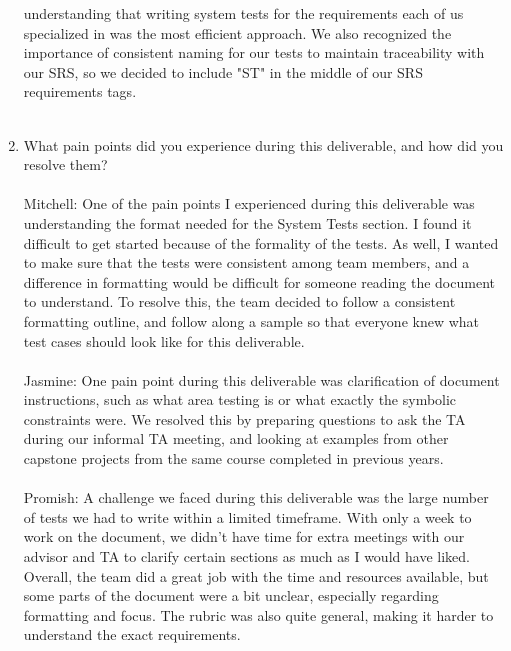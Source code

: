\documentclass[12pt, titlepage]{article}
\begin{document}
\begin{enumerate}
  understanding that writing system tests for the requirements each of us specialized in 
  was the most efficient approach. We also recognized the importance of consistent naming 
  for our tests to maintain traceability with our SRS, so we decided to include "ST" in 
  the middle of our SRS requirements tags.\\\\
  \item What pain points did you experience during this deliverable, and how
    did you resolve them?\\\\
  \newline
  \hspace{2em} Mitchell: One of the pain points I experienced during this deliverable was understanding the
  format needed for the System Tests section. I found it difficult to get started because of the formality
  of the tests. As well, I wanted to make sure that the tests were consistent among team members, and a difference
  in formatting would be difficult for someone reading the document to understand. To resolve this, the team decided
  to follow a consistent formatting outline, and follow along a sample so that everyone knew what test cases
  should look like for this deliverable.\\\\
  \hspace{2em} Jasmine: One pain point during this deliverable was clarification of document instructions, 
  such as what area testing is or what exactly the symbolic constraints were. We resolved this by preparing 
  questions to ask the TA during our informal TA meeting, and looking at examples from other capstone projects 
  from the same course completed in previous years.\\\\
  \hspace{2em} Promish: A challenge we faced during this deliverable was the 
  large number of tests we had to write within a limited timeframe. With only a week 
  to work on the document, we didn’t have time for extra meetings with our advisor and 
  TA to clarify certain sections as much as I would have liked. Overall, the team did a 
  great job with the time and resources available, but some parts of the document were a 
  bit unclear, especially regarding formatting and focus. The rubric was also quite 
  general, making it harder to understand the exact requirements.\\\\

\end{enumerate}
\end{document}
